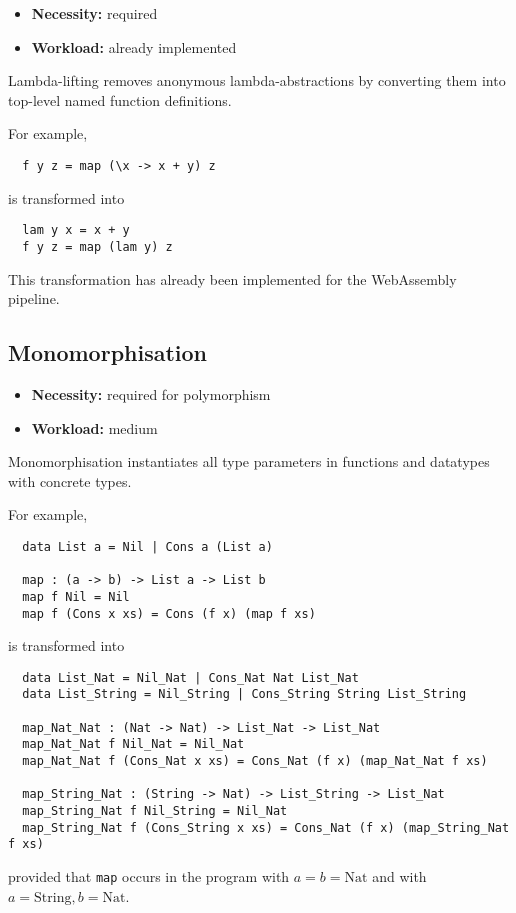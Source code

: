 \begin{itemize}
\item {\bf Necessity:} required
\item {\bf Workload:} already implemented
\end{itemize}

\noindent Lambda-lifting removes anonymous lambda-abstractions by converting
them into top-level named function definitions.

\medskip

\noindent For example,
\begin{verbatim}
  f y z = map (\x -> x + y) z
\end{verbatim}
is transformed into
\begin{verbatim}
  lam y x = x + y
  f y z = map (lam y) z
\end{verbatim}
This transformation has already been implemented for the WebAssembly pipeline.

\subsection{Monomorphisation}

\begin{itemize}
\item {\bf Necessity:} required for polymorphism
\item {\bf Workload:} medium
\end{itemize}

\noindent Monomorphisation instantiates all type parameters in
functions and datatypes with concrete types.

\medskip

\noindent For example,
\begin{verbatim}
  data List a = Nil | Cons a (List a)

  map : (a -> b) -> List a -> List b
  map f Nil = Nil
  map f (Cons x xs) = Cons (f x) (map f xs)
\end{verbatim}
is transformed into
\begin{verbatim}
  data List_Nat = Nil_Nat | Cons_Nat Nat List_Nat
  data List_String = Nil_String | Cons_String String List_String

  map_Nat_Nat : (Nat -> Nat) -> List_Nat -> List_Nat
  map_Nat_Nat f Nil_Nat = Nil_Nat
  map_Nat_Nat f (Cons_Nat x xs) = Cons_Nat (f x) (map_Nat_Nat f xs)

  map_String_Nat : (String -> Nat) -> List_String -> List_Nat
  map_String_Nat f Nil_String = Nil_Nat
  map_String_Nat f (Cons_String x xs) = Cons_Nat (f x) (map_String_Nat f xs)
\end{verbatim}
provided that \texttt{map} occurs in the program with $a = b =
\mathrm{Nat}$ and with $a = \mathrm{String}, b = \mathrm{Nat}$.

